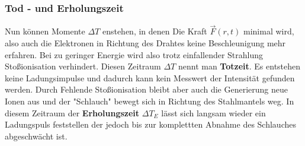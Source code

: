 \subsubsection{Tod - und Erholungszeit}
Nun können Momente $\Delta T$ enstehen, in denen Die Kraft $\vec{F}(r,t)$ minimal wird, also auch die Elektronen in Richtung des Drahtes keine Beschleunigung mehr erfahren. 
Bei zu geringer Energie wird also trotz einfallender Strahlung Stoßionisation verhindert. Diesen Zeitraum $\Delta T$ nennt man \textbf{Totzeit}. Es entstehen keine Ladungsimpulse und dadurch kann kein Messwert der Intensität gefunden werden.
Durch Fehlende Stoßionisation bleibt aber auch die Generierung neue Ionen aus und der "Schlauch" bewegt sich in Richtung des Stahlmantels weg. 
In diesem Zeitraum der \textbf{Erholungszeit} $\Delta T_E$ lässt sich langsam wieder ein Ladungspuls feststellen der jedoch bis zur komplettten Abnahme des Schlauches abgeschwächt ist.

